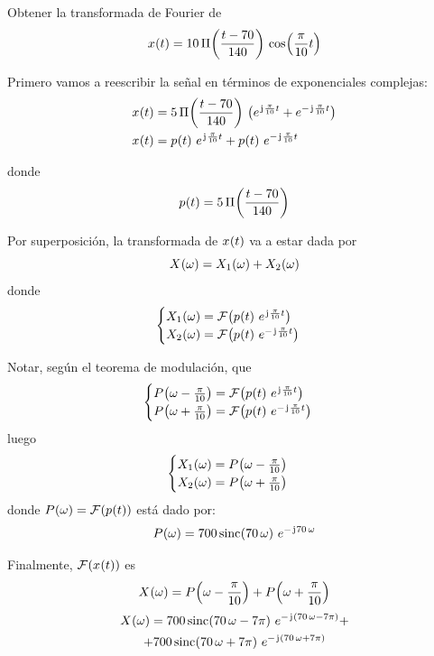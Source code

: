 \begin{mdframed}[style=ExampleFrame]
    \begin{example}
    \end{example}
    Obtener la transformada de Fourier de
    \[
        \fx[x]{t} = 10 \, \pulse[70]{t}{140} \, \fx[\cos]{\frac{\pi}{10} t}
    \]


    Primero vamos a reescribir la señal en términos de exponenciales complejas:
    \begin{align*}
        \fx[x]{t} &= 5 \, \pulse[70]{t}{140} \, \inParentheses{e^{\iu \frac{\pi}{10} t} + e^{- \iu \frac{\pi}{10} t}}
        \\
        \fx[x]{t} &= \fx[p]{t} \, e^{\iu \frac{\pi}{10} t} + \fx[p]{t} \, e^{- \iu \frac{\pi}{10} t}
    \end{align*}

    donde
    \[
        \fx[p]{t} = 5 \, \pulse[70]{t}{140}
    \]

    Por superposición, la transformada de $\fx[x]{t}$ va a estar dada por
    \[
        \fx[X]{\omega} = \fx[X_1]{\omega} + \fx[X_2]{\omega}
    \]
    donde
    \[
        \begin{cases}
            \fx[X_1]{\omega} = \fourier{\fx[p]{t} \, e^{\iu \frac{\pi}{10} t}}
            \\
            \fx[X_2]{\omega} = \fourier{\fx[p]{t} \, e^{- \iu \frac{\pi}{10} t}}
        \end{cases}
    \]

    Notar, según el teorema de modulación, que
    \[
        \begin{cases}
            \fx[P]{\omega - \frac{\pi}{10}} = \fourier{\fx[p]{t} \, e^{\iu \frac{\pi}{10} t}}
            \\
            \fx[P]{\omega + \frac{\pi}{10}} = \fourier{\fx[p]{t} \, e^{- \iu \frac{\pi}{10} t}}
        \end{cases}
    \]
    luego
    \[
        \begin{cases}
            \fx[X_1]{\omega} = \fx[P]{\omega - \frac{\pi}{10}}
            \\
            \fx[X_2]{\omega} = \fx[P]{\omega + \frac{\pi}{10}}
        \end{cases}
    \]
    donde $\fx[P]{\omega} = \fourier{\fx[p]{t}}$ está dado por:
    \[
        \fx[P]{\omega} = 700 \fx[\sinc]{70 \, \omega} \, e^{- \iu 70 \, \omega}
    \]

    Finalmente, $\fourier{\fx[x]{t}}$ es
    \[
        \fx[X]{\omega}
        = \fx[P]{\omega - \frac{\pi}{10}} + \fx[P]{\omega + \frac{\pi}{10}}
    \]
    \begin{multline*}
        \fx[X]{\omega}
        = 700 \fx[\sinc]{70 \, \omega - 7 \pi} \, e^{- \iu (70 \, \omega - 7 \pi)} +
        \\
        + 700 \fx[\sinc]{70 \, \omega + 7 \pi} \, e^{- \iu (70 \, \omega + 7 \pi)}
    \end{multline*}
\end{mdframed}


